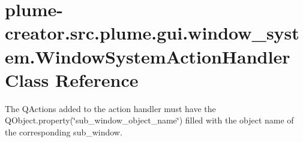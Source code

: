 \hypertarget{classplume-creator_1_1src_1_1plume_1_1gui_1_1window__system_1_1_window_system_action_handler}{}\section{plume-\/creator.src.\+plume.\+gui.\+window\+\_\+system.\+Window\+System\+Action\+Handler Class Reference}
\label{classplume-creator_1_1src_1_1plume_1_1gui_1_1window__system_1_1_window_system_action_handler}


The Q\+Actions added to the action handler must have the Q\+Object.\+property(\char`\"{}sub\+\_\+window\+\_\+object\+\_\+name\char`\"{}) filled with the object name of the corresponding sub\+\_\+window.  


